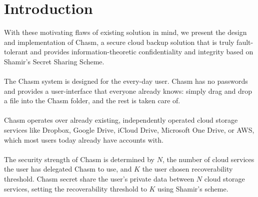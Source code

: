 \documentclass[letterpaper,twocolumn,10pt]{article}
\begin{document}
\section{Introduction}
With these motivating flaws of existing solution in mind, we present the design and implementation of Chasm, a secure cloud backup solution that is truly fault-tolerant and provides information-theoretic confidentiality and integrity based on Shamir's Secret Sharing Scheme.
\\\\
The Chasm system is designed for the every-day user. Chasm has no passwords and provides a user-interface that everyone already knows: simply drag and drop a file into the Chasm folder, and the rest is taken care of.
\\\\
Chasm operates over already existing, independently operated cloud storage services like Dropbox, Google Drive, iCloud Drive, Microsoft One Drive, or AWS, which most users today already have accounts with.
\\\\
The security strength of Chasm is determined by $N$, the number of cloud services the user has delegated Chasm to use, and $K$ the user chosen recoverability threshold. Chasm secret share the user's private data between $N$ cloud storage services, setting the recoverability threshold to $K$ using Shamir's scheme.
\end{document}
